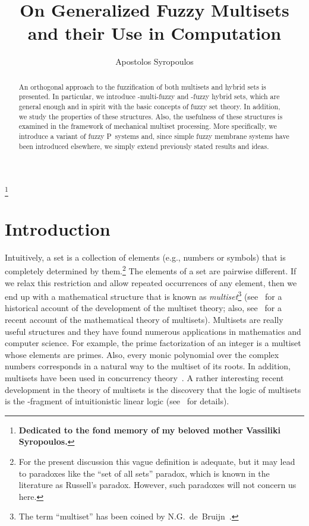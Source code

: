 \documentclass{amsart}
\theoremstyle{definition}
\begin{document}
\title{On Generalized Fuzzy Multisets and their Use in Computation}
\author{Apostolos Syropoulos}
\address{Greek Molecular Computing Group\\
        366, 28th October St.\\
        GR-671\ 00\ \ Xanthi\ GREECE}

\thanks{\textbf{Dedicated to the fond memory of my beloved mother Vassiliki Syropoulos.}\newline
{}
\newline{}}
\maketitle
\begin{abstract}
An orthogonal approach to the fuzzification of both multisets and hybrid
sets is presented. In particular, we introduce -multi-fuzzy and 
-fuzzy hybrid sets, which are general enough and in spirit with the
basic concepts of fuzzy set theory. In addition, we study the properties of
these structures. Also, the usefulness of these structures is examined in
the framework of mechanical multiset processing. More specifically, we 
introduce a variant of fuzzy P~systems and, since simple
fuzzy membrane systems have been introduced elsewhere, we simply extend
previously stated results and ideas.
\end{abstract}
\section{Introduction}
Intuitively, a set is a collection of elements (e.g., numbers or symbols) that
is completely determined by them.\footnote{For the present discussion this 
vague definition is adequate, but it may lead to paradoxes like the ``set of 
all sets'' paradox, which is known in the literature as Russell's paradox. 
However, such paradoxes will not concern us here.}  The elements of a set are 
pairwise different. If we relax this restriction and allow repeated 
occurrences of any element, then we end up with a mathematical structure that 
is known as {\em multiset}\footnote{The term ``multiset'' has been coined by 
N.G.~de~Bruijn~\cite{knuth81}.} (see~\cite{blizard91} for a historical account
of the development of the multiset theory; also, see~\cite{syropoulos01} for a
recent account of the mathematical theory of multisets). Multisets are really 
useful structures and they have found numerous applications in mathematics and 
computer science. For example, the prime factorization of an integer  is 
a multiset  whose elements are primes. Also, every monic 
polynomial  over the complex numbers corresponds in a natural way to the
multiset  of its roots. In addition, multisets have been used in 
concurrency theory~\cite{deNicola96}. A rather interesting recent development
in the theory of multisets is the discovery that the logic of multisets is the
-fragment of intuitionistic linear 
logic (see~\cite{tzouvaras98,tzouvaras03} for details).
\end{document}

